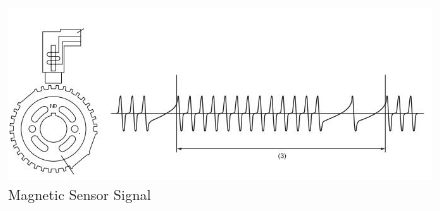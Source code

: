 	\begin{figure}[htbp]
		\centering
			\includegraphics[scale=0.6]{figuras/fig-ckp-signal.png}
		\caption{Magnetic Sensor Signal \cite{cam-sensor-signal}}
		\label{fig:ckp-signal}
	\end{figure}